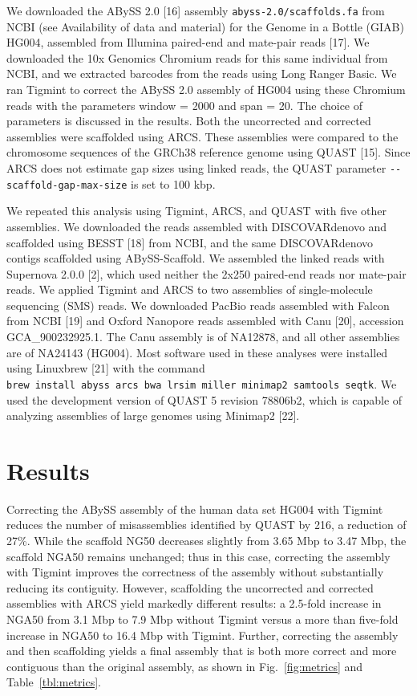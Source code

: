\documentclass{bmcart}
\begin{document}
We downloaded the ABySS 2.0 {[}16{]} assembly \texttt{abyss-2.0/scaffolds.fa} from NCBI (see Availability of data and material) for the Genome in a Bottle (GIAB) HG004, assembled from Illumina paired-end and mate-pair reads {[}17{]}. We downloaded the 10x Genomics Chromium reads for this same individual from NCBI, and we extracted barcodes from the reads using Long Ranger Basic. We ran Tigmint to correct the ABySS 2.0 assembly of HG004 using these Chromium reads with the parameters window = 2000 and span = 20. The choice of parameters is discussed in the results. Both the uncorrected and corrected assemblies were scaffolded using ARCS. These assemblies were compared to the chromosome sequences of the GRCh38 reference genome using QUAST {[}15{]}. Since ARCS does not estimate gap sizes using linked reads, the QUAST parameter \texttt{-\/-scaffold-gap-max-size} is set to 100 kbp.

We repeated this analysis using Tigmint, ARCS, and QUAST with five other assemblies. We downloaded the reads assembled with DISCOVARdenovo and scaffolded using BESST {[}18{]} from NCBI, and the same DISCOVARdenovo contigs scaffolded using ABySS-Scaffold. We assembled the linked reads with Supernova 2.0.0 {[}2{]}, which used neither the 2x250 paired-end reads nor mate-pair reads. We applied Tigmint and ARCS to two assemblies of single-molecule sequencing (SMS) reads. We downloaded PacBio reads assembled with Falcon from NCBI {[}19{]} and Oxford Nanopore reads assembled with Canu {[}20{]}, accession GCA\_900232925.1. The Canu assembly is of NA12878, and all other assemblies are of NA24143 (HG004). Most software used in these analyses were installed using Linuxbrew {[}21{]} with the command \texttt{brew\ install\ abyss\ arcs\ bwa\ lrsim\ miller\ minimap2\ samtools\ seqtk}. We used the development version of QUAST 5 revision 78806b2, which is capable of analyzing assemblies of large genomes using Minimap2 {[}22{]}.

\hypertarget{results}{%
\section*{Results}\label{results}}

Correcting the ABySS assembly of the human data set HG004 with Tigmint reduces the number of misassemblies identified by QUAST by 216, a reduction of 27\%. While the scaffold NG50 decreases slightly from 3.65 Mbp to 3.47 Mbp, the scaffold NGA50 remains unchanged; thus in this case, correcting the assembly with Tigmint improves the correctness of the assembly without substantially reducing its contiguity. However, scaffolding the uncorrected and corrected assemblies with ARCS yield markedly different results: a 2.5-fold increase in NGA50 from 3.1 Mbp to 7.9 Mbp without Tigmint versus a more than five-fold increase in NGA50 to 16.4 Mbp with Tigmint. Further, correcting the assembly and then scaffolding yields a final assembly that is both more correct and more contiguous than the original assembly, as shown in Fig.~\ref{fig:metrics} and Table~\ref{tbl:metrics}.
\end{document}
